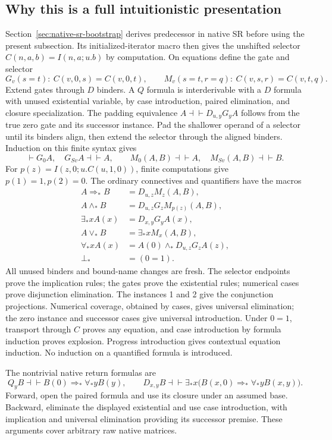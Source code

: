 \subsection{Why this is a full intuitionistic presentation}
\label{sec:logical-reconstruction}

Section~\ref{sec:native-sr-bootstrap} derives predecessor in native SR
before using the present subsection. Its initialized-iterator macro then
gives the unshifted selector $C(n,a,b)=I(n,a;u.b)$ by computation. On equations define the gate and selector
\[
 G_v(s=t):\ C(v,0,s)=C(v,0,t),\qquad
 M_v(s=t,r=q):\ C(v,s,r)=C(v,t,q).
\]
Extend gates through $D$ binders. A $Q$ formula is interderivable with
a $D$ formula with unused existential variable, by case introduction,
paired elimination, and closure specialization. The padding equivalence
$A\dashv\vdash D_{u,y}G_yA$ follows from the true zero gate and its
successor instance. Pad the shallower operand of a selector until its
binders align, then extend the selector through the aligned binders.
Induction on this finite syntax gives
\[
 \vdash G_0A,\quad G_{Sv}A\dashv\vdash A,\qquad
 M_0(A,B)\dashv\vdash A,\quad M_{Sv}(A,B)\dashv\vdash B.
\]
For $p(z)=I(z,0;u.C(u,1,0))$, finite computations give $p(1)=1,p(2)=0$.
The ordinary connectives and quantifiers have the macros
\[
\begin{aligned}
 A\Rightarrow_*B&=D_{u,z}M_z(A,B),\\
 A\land_*B&=D_{u,z}G_zM_{p(z)}(A,B),\\
 \exists_*xA(x)&=D_{x,y}G_yA(x),\\
 A\lor_*B&=\exists_*xM_x(A,B),\\
 \forall_*xA(x)&=A(0)\land_*D_{u,z}G_zA(z),\\
 \bot_*&=(0=1).
\end{aligned}
\]
All unused binders and bound-name changes are fresh. The selector endpoints
prove the implication rules; the gates prove the existential rules;
numerical cases prove disjunction elimination. The instances 1 and 2
give the conjunction projections. Numerical coverage, obtained by cases,
gives universal elimination; the zero instance and successor cases give
universal introduction. Under $0=1$, transport through $C$ proves any
equation, and case introduction by formula induction proves explosion.
Progress introduction gives contextual equation induction. No induction
on a quantified formula is introduced.

The nontrivial native return formulas are
\[
 Q_yB\dashv\vdash B(0)\Rightarrow_*\forall_*yB(y),\qquad
 D_{x,y}B\dashv\vdash
 \exists_*x\bigl(B(x,0)\Rightarrow_*\forall_*yB(x,y)\bigr).
\]
Forward, open the paired formula and use its closure under an assumed
base. Backward, eliminate the displayed existential and use case
introduction, with implication and universal elimination providing its
successor premise. These arguments cover arbitrary raw native matrices.

